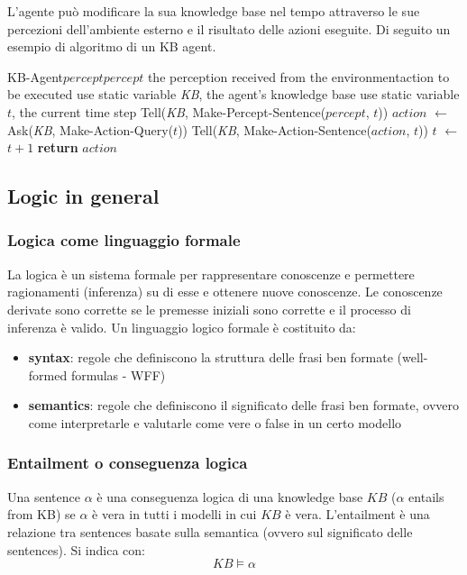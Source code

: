 L'agente può modificare la sua knowledge base nel tempo attraverso le sue percezioni dell'ambiente esterno e il risultato delle
azioni eseguite. Di seguito un esempio di algoritmo di un KB agent.

\begin{algo}{KB-Agent}{$percept$}{$percept$ the perception received from the environment}{action to be executed}
	\State use static variable \textit{KB}, the agent's knowledge base
	\State use static variable $t$, the current time step
	\State Tell(\textit{KB}, Make-Percept-Sentence($percept$, $t$)) 
	\State $action$ $\gets$ Ask(\textit{KB}, Make-Action-Query($t$)) 
	\State Tell(\textit{KB}, Make-Action-Sentence($action$, $t$)) 
	\State $t$ $\gets$ $t + 1$
	\State \textbf{return} $action$
\end{algo}

\newpage

\subsection{Logic in general}
\subsubsection*{Logica come linguaggio formale}
La logica è un sistema formale per rappresentare conoscenze e permettere ragionamenti (inferenza) su di esse e ottenere nuove
conoscenze. Le conoscenze derivate sono corrette se le premesse iniziali sono corrette e il processo di inferenza è valido.
Un linguaggio logico formale è costituito da:
\begin{itemize}
	\item \textbf{syntax}: regole che definiscono la struttura delle frasi ben formate (well-formed formulas - WFF)
	\item \textbf{semantics}: regole che definiscono il significato delle frasi ben formate, ovvero come interpretarle
	e valutarle come vere o false in un certo modello
\end{itemize}

\subsubsection*{Entailment o conseguenza logica}
Una sentence \(\alpha\) è una conseguenza logica di una knowledge base \(KB\) (\(\alpha\) entails from KB) se \(\alpha\) è vera
in tutti i modelli in cui \(KB\) è vera. L'entailment è una relazione tra sentences basate sulla semantica (ovvero sul significato
delle sentences). Si indica con: 
\[KB \models \alpha\]

